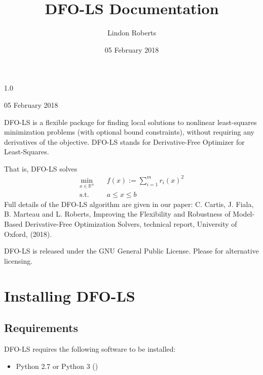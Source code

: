 \documentclass[letterpaper,10pt,english]{sphinxmanual}
\title{DFO-LS Documentation}
\date{05 February 2018}
\author{Lindon Roberts}
\begin{document}
\maketitle
\sphinxtableofcontents
{}\label{\detokenize{index::doc}}


 1.0

 05 February 2018

 

DFO-LS is a flexible package for finding local solutions to nonlinear least-squares minimization problems (with optional bound constraints), without requiring any derivatives of the objective. DFO-LS stands for Derivative-Free Optimizer for Least-Squares.

That is, DFO-LS solves
\begin{equation*}
\begin{split}\min_{x\in\mathbb{R}^n}  &\quad  f(x) := \sum_{i=1}^{m}r_{i}(x)^2 \\
\text{s.t.} &\quad  a \leq x \leq b\end{split}
\end{equation*}
Full details of the DFO-LS algorithm are given in our paper: C. Cartis, J. Fiala, B. Marteau and L. Roberts, Improving the Flexibility and Robustness of Model-Based Derivative-Free Optimization Solvers, technical report, University of Oxford, (2018).

DFO-LS is released under the GNU General Public License. Please  for alternative licensing.


\chapter{Installing DFO-LS}
\label{\detokenize{install:installing-dfo-ls}}\label{\detokenize{install::doc}}\label{\detokenize{install:dfo-ls-derivative-free-optimizer-for-least-squares-minimization}}

\section{Requirements}
\label{\detokenize{install:requirements}}
DFO-LS requires the following software to be installed:
\begin{itemize}
\item {} 
Python 2.7 or Python 3 ()

\end{itemize}
\end{document}
